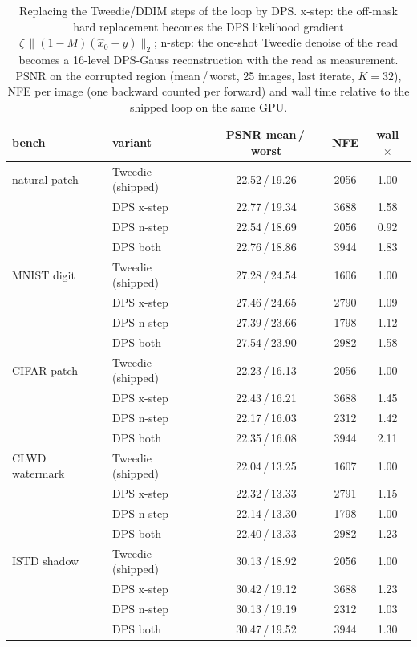 \begin{table}[t]
\centering\small
\caption{Replacing the Tweedie/DDIM steps of the loop by DPS. x-step: the off-mask hard replacement becomes the DPS likelihood gradient $\zeta\,\|(1{-}M)(\hat x_0 - y)\|_2$; n-step: the one-shot Tweedie denoise of the read becomes a 16-level DPS-Gauss reconstruction with the read as measurement. PSNR on the corrupted region (mean\,/\,worst, 25 images, last iterate, $K{=}32$), NFE per image (one backward counted per forward) and wall time relative to the shipped loop on the same GPU.}
\label{tab:ablation_dps}
\begin{tabular}{llccc}
\toprule
bench & variant & PSNR mean\,/\,worst & NFE & wall $\times$ \\
\midrule
natural patch & Tweedie (shipped) & 22.52\,/\,19.26 & 2056 & 1.00 \\
 & DPS x-step & 22.77\,/\,19.34 & 3688 & 1.58 \\
 & DPS n-step & 22.54\,/\,18.69 & 2056 & 0.92 \\
 & DPS both & 22.76\,/\,18.86 & 3944 & 1.83 \\
\midrule
MNIST digit & Tweedie (shipped) & 27.28\,/\,24.54 & 1606 & 1.00 \\
 & DPS x-step & 27.46\,/\,24.65 & 2790 & 1.09 \\
 & DPS n-step & 27.39\,/\,23.66 & 1798 & 1.12 \\
 & DPS both & 27.54\,/\,23.90 & 2982 & 1.58 \\
\midrule
CIFAR patch & Tweedie (shipped) & 22.23\,/\,16.13 & 2056 & 1.00 \\
 & DPS x-step & 22.43\,/\,16.21 & 3688 & 1.45 \\
 & DPS n-step & 22.17\,/\,16.03 & 2312 & 1.42 \\
 & DPS both & 22.35\,/\,16.08 & 3944 & 2.11 \\
\midrule
CLWD watermark & Tweedie (shipped) & 22.04\,/\,13.25 & 1607 & 1.00 \\
 & DPS x-step & 22.32\,/\,13.33 & 2791 & 1.15 \\
 & DPS n-step & 22.14\,/\,13.30 & 1798 & 1.00 \\
 & DPS both & 22.40\,/\,13.33 & 2982 & 1.23 \\
\midrule
ISTD shadow & Tweedie (shipped) & 30.13\,/\,18.92 & 2056 & 1.00 \\
 & DPS x-step & 30.42\,/\,19.12 & 3688 & 1.23 \\
 & DPS n-step & 30.13\,/\,19.19 & 2312 & 1.03 \\
 & DPS both & 30.47\,/\,19.52 & 3944 & 1.30 \\
\bottomrule
\end{tabular}
\end{table}
